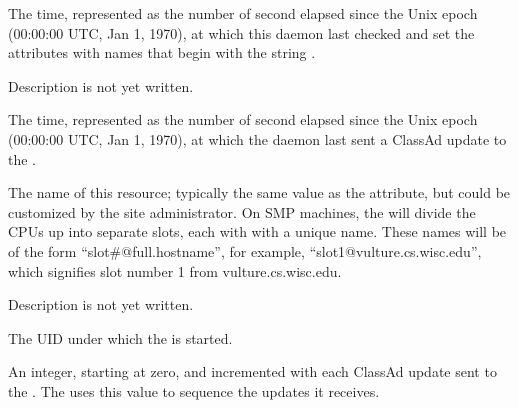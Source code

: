 \begin{description}
\item[\AdAttr{MonitorSelfTime}:] The  time, represented as the number of
  second elapsed since the Unix epoch (00:00:00 UTC, Jan 1, 1970),
  at which this daemon last checked and set the attributes with names that
  begin with the string .
  

\item[\AdAttr{MyAddress}:] Description is not yet written.

\item[\AdAttr{MyCurrentTime}:] The time, represented as the number of
  second elapsed since the Unix epoch (00:00:00 UTC, Jan 1, 1970),
  at which the  daemon last sent a ClassAd update to the
  .

\item[\AdAttr{Name}:] The name of this resource; typically the same value as
  the  attribute, but could be customized by the site
  administrator.
  On SMP machines, the  will divide the CPUs up into separate
  slots, each with with a unique name.
  These names will be of the form ``slot\#@full.hostname'', for example,
  ``slot1@vulture.cs.wisc.edu'', which signifies slot number 1 from
  vulture.cs.wisc.edu.

\item[\AdAttr{PublicNetworkIpAddr}:] Description is not yet written.

\item[\AdAttr{RealUid}:] The UID under which the  is started.

\item[\AdAttr{UpdateSequenceNumber}:] An integer, starting at zero,
  and incremented with each ClassAd update sent to the .
  The  uses this value to sequence the updates it
  receives.

\end{description}

